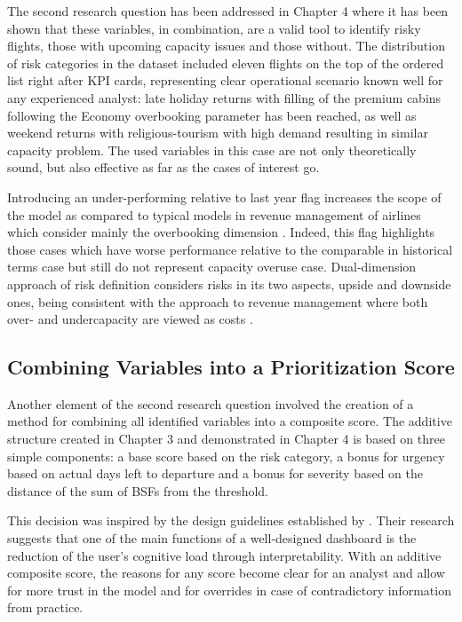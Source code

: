 The second research question has been addressed in Chapter 4 where it has been shown that these variables, in combination, are a valid tool to identify risky flights, those with upcoming capacity issues and those without. The distribution of risk categories in the dataset included eleven flights on the top of the ordered list right after KPI cards, representing clear operational scenario known well for any experienced analyst: late holiday returns with filling of the premium cabins following the Economy overbooking parameter has been reached, as well as weekend returns with religious-tourism with high demand resulting in similar capacity problem. The used variables in this case are not only theoretically sound, but also effective as far as the cases of interest go.

Introducing an under-performing relative to last year flag increases the scope of the model as compared to typical models in revenue management of airlines which consider mainly the overbooking dimension \citep{Belobaba1987, Belobaba1989}. Indeed, this flag highlights those cases which have worse performance relative to the comparable in historical terms case but still do not represent capacity overuse case. Dual-dimension approach of risk definition considers risks in its two aspects, upside and downside ones, being consistent with the approach to revenue management where both over- and undercapacity are viewed as costs \citep{BodilyWeatherford1995}.

\subsection{Combining Variables into a Prioritization Score}

Another element of the second research question involved the creation of a method for combining all identified variables into a composite score. The additive structure created in Chapter 3 and demonstrated in Chapter 4 is based on three simple components: a base score based on the risk category, a bonus for urgency based on actual days left to departure and a bonus for severity based on the distance of the sum of BSFs from the threshold.

This decision was inspired by the design guidelines established by \citet{YigitbasiogluVelcu2012}. Their research suggests that one of the main functions of a well-designed dashboard is the reduction of the user's cognitive load through interpretability. With an additive composite score, the reasons for any score become clear for an analyst and allow for more trust in the model and for overrides in case of contradictory information from practice.

